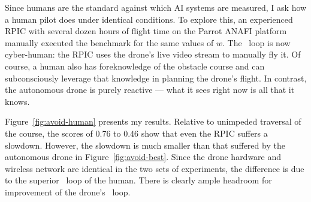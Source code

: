 Since humans are the standard against which AI systems are measured,
I ask how a human pilot does under identical conditions. To
explore this, an experienced RPIC with several dozen hours of flight
time on the Parrot ANAFI platform manually executed the benchmark for
the same values of $w$. The \ooda~loop is now cyber-human: the RPIC uses the drone's live video stream to manually fly it.  Of course, a human also
has foreknowledge of the obstacle course and can subconsciously
leverage that knowledge in planning the drone's flight.  In contrast,
the autonomous drone is purely reactive --- what it sees right now is
all that it knows.

Figure~\ref{fig:avoid-human} presents my results.  Relative to
unimpeded traversal of the course, the scores of 0.76 to 0.46 show
that even the RPIC suffers a slowdown.  However, the slowdown is much
smaller than that suffered by the autonomous drone in
Figure~\ref{fig:avoid-best}.  Since the drone hardware and wireless
network are identical in the two sets of experiments, the difference
is due to the superior \ooda~loop of the human.  There is
clearly ample headroom for improvement of the drone's \ooda~loop.

